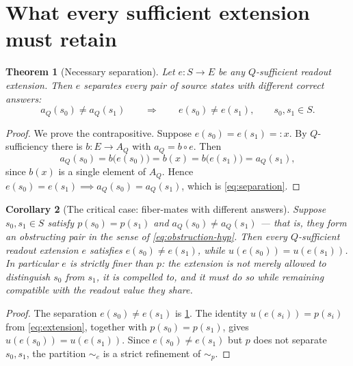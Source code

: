 \documentclass[11pt,reqno]{amsart}
\theoremstyle{plain}
\newtheorem{theorem}{Theorem}[section]
\newtheorem{corollary}[theorem]{Corollary}
\theoremstyle{definition}
\newcommand{\Src}{S}
\begin{document}
\section{What every sufficient extension must retain}\label{sec:separation}

\begin{theorem}[Necessary separation]\label{thm:separation}
Let $e\colon\Src\to E$ be any $Q$-sufficient readout extension. Then $e$ separates every pair of
source states with different correct answers:
\begin{equation}\label{eq:separation}
a_Q(s_0)\neq a_Q(s_1)
\qquad\Longrightarrow\qquad
e(s_0)\neq e(s_1),
\qquad s_0,s_1\in\Src .
\end{equation}
\end{theorem}

\begin{proof}
We prove the contrapositive. Suppose $e(s_0)=e(s_1)=:x$. By $Q$-sufficiency there is
$b\colon E\to A_Q$ with $a_Q=b\circ e$. Then
\begin{equation*}
a_Q(s_0)=b\bigl(e(s_0)\bigr)=b(x)=b\bigl(e(s_1)\bigr)=a_Q(s_1),
\end{equation*}
since $b(x)$ is a single element of $A_Q$. Hence $e(s_0)=e(s_1)\implies a_Q(s_0)=a_Q(s_1)$, which
is \eqref{eq:separation}.
\end{proof}

\begin{corollary}[The critical case: fiber-mates with different answers]\label{cor:critical-pair}
Suppose $s_0,s_1\in\Src$ satisfy $p(s_0)=p(s_1)$ and $a_Q(s_0)\neq a_Q(s_1)$ --- that is, they
form an obstructing pair in the sense of \eqref{eq:obstruction-hyp}. Then every $Q$-sufficient
readout extension $e$ satisfies $e(s_0)\neq e(s_1)$, while $u(e(s_0))=u(e(s_1))$. In particular
$e$ is strictly finer than $p$: the extension is not merely allowed to distinguish $s_0$ from
$s_1$, it is \emph{compelled} to, and it must do so while remaining compatible with the readout
value they share.
\end{corollary}

\begin{proof}
The separation $e(s_0)\neq e(s_1)$ is \cref{thm:separation}. The identity
$u(e(s_i))=p(s_i)$ from \eqref{eq:extension}, together with $p(s_0)=p(s_1)$, gives
$u(e(s_0))=u(e(s_1))$. Since $e(s_0)\neq e(s_1)$ but $p$ does not separate $s_0,s_1$, the
partition $\sim_e$ is a strict refinement of $\sim_p$.
\end{proof}
\end{document}
